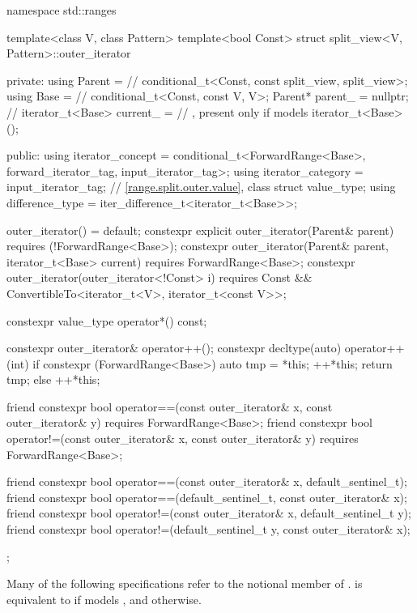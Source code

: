 \begin{codeblock}
namespace std::ranges {
  template<class V, class Pattern>
  template<bool Const>
  struct split_view<V, Pattern>::outer_iterator {
  private:
    using Parent =                              // \expos
      conditional_t<Const, const split_view, split_view>;
    using Base   =                              // \expos
      conditional_t<Const, const V, V>;
    Parent* parent_ = nullptr;                  // \expos
    iterator_t<Base> current_ =                 // \expos, present only if  models 
      iterator_t<Base>();

  public:
    using iterator_concept  =
      conditional_t<ForwardRange<Base>, forward_iterator_tag, input_iterator_tag>;
    using iterator_category = input_iterator_tag;
    // \ref{range.split.outer.value}, class 
    struct value_type;
    using difference_type   = iter_difference_t<iterator_t<Base>>;

    outer_iterator() = default;
    constexpr explicit outer_iterator(Parent& parent)
      requires (!ForwardRange<Base>);
    constexpr outer_iterator(Parent& parent, iterator_t<Base> current)
      requires ForwardRange<Base>;
    constexpr outer_iterator(outer_iterator<!Const> i)
      requires Const && ConvertibleTo<iterator_t<V>, iterator_t<const V>>;

    constexpr value_type operator*() const;

    constexpr outer_iterator& operator++();
    constexpr decltype(auto) operator++(int) {
      if constexpr (ForwardRange<Base>) {
        auto tmp = *this;
        ++*this;
        return tmp;
      } else
        ++*this;
    }

    friend constexpr bool operator==(const outer_iterator& x, const outer_iterator& y)
      requires ForwardRange<Base>;
    friend constexpr bool operator!=(const outer_iterator& x, const outer_iterator& y)
      requires ForwardRange<Base>;

    friend constexpr bool operator==(const outer_iterator& x, default_sentinel_t);
    friend constexpr bool operator==(default_sentinel_t, const outer_iterator& x);
    friend constexpr bool operator!=(const outer_iterator& x, default_sentinel_t y);
    friend constexpr bool operator!=(default_sentinel_t y, const outer_iterator& x);
  };
}
\end{codeblock}

\pnum
Many of the following specifications refer to the notional member
 of .
 is equivalent to  if 
models , and  otherwise.

